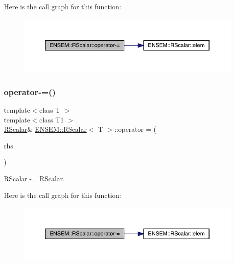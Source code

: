 Here is the call graph for this function\+:
\nopagebreak
\begin{figure}[H]
\begin{center}
\leavevmode
\includegraphics[width=350pt]{d0/d8c/classENSEM_1_1RScalar_a6d158db5ecf3dcc81fe905c6664cac58_cgraph}
\end{center}
\end{figure}
\mbox{\label{classENSEM_1_1RScalar_a6d158db5ecf3dcc81fe905c6664cac58}} 
\subsubsection{\texorpdfstring{operator-\/=()}{operator-=()}\hspace{0.1cm}{\footnotesize\ttfamily [3/3]}}
{\footnotesize\ttfamily template$<$class T $>$ \\
template$<$class T1 $>$ \\
\mbox{\hyperlink{classENSEM_1_1RScalar}{R\+Scalar}}\& \mbox{\hyperlink{classENSEM_1_1RScalar}{E\+N\+S\+E\+M\+::\+R\+Scalar}}$<$ T $>$\+::operator-\/= (\begin{DoxyParamCaption}\item[{const \mbox{\hyperlink{classENSEM_1_1RScalar}{R\+Scalar}}$<$ T1 $>$ \&}]{rhs }\end{DoxyParamCaption})\hspace{0.3cm}{\ttfamily [inline]}}



\mbox{\hyperlink{classENSEM_1_1RScalar}{R\+Scalar}} -\/= \mbox{\hyperlink{classENSEM_1_1RScalar}{R\+Scalar}}. 

Here is the call graph for this function\+:
\nopagebreak
\begin{figure}[H]
\begin{center}
\leavevmode
\includegraphics[width=350pt]{d0/d8c/classENSEM_1_1RScalar_a6d158db5ecf3dcc81fe905c6664cac58_cgraph}
\end{center}
\end{figure}
\mbox{\label{classENSEM_1_1RScalar_a8d8cc49d7fed142b93c987c653465000}} 
